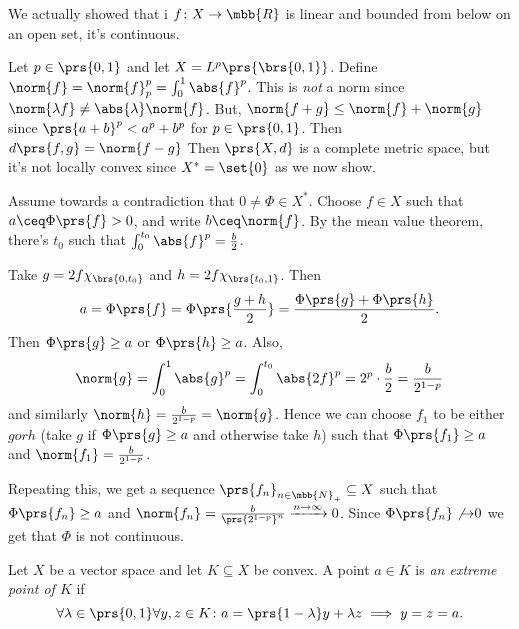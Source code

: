 \documentclass[10pt, twoside]{book}
\begin{document}
\begin{remark}
We actually showed that i $f \colon X \to \mbb{R}$ is linear and bounded from below on an open set, it's continuous.
\end{remark}

\begin{example}
Let $p \in \prs{0,1}$ and let $X = L^p\prs{\brs{0,1}}$.
Define
$\norm{f} = \norm{f}_p^p = \int_0^1 \abs{f}^p$.
This is \emph{not} a norm since $\norm{\lambda f} \neq \abs{\lambda} \norm{f}$. But, $\norm{f+g} \leq \norm{f} + \norm{g}$ since $\prs{a+b}^p < a^p + b^p$ for $p \in \prs{0,1}$.
Then $d\prs{f,g} = \norm{f-g}$ Then $\prs{X,d}$ is a complete metric space, but it's not locally convex since $X^* = \set{0}$ as we now show.

Assume towards a contradiction that $0 \neq \Phi \in X^*$. Choose $f \in X$ such that $a \ceq \Phi\prs{f} > 0$, and write $b \ceq \norm{f}$. By the mean value theorem, there's $t_0$ such that $\int_0^{t_0} \abs{f}^p = \frac{b}{2}$.

Take $g = 2 f \chi_{\brs{0,t_0}}$ and $h = 2 f\chi_{\brs{t_0, 1}}$. Then
\[a = \Phi\prs{f} = \Phi\prs{\frac{g+h}{2}} = \frac{\Phi\prs{g} + \Phi\prs{h}}{2} \text{.}\]
Then $\Phi\prs{g} \geq a$ or $\Phi\prs{h} \geq a$.
Also,
\[\norm{g} = \int_0^1 \abs{g}^p = \int_0^{t_0} \abs{2f}^p = 2^p \cdot \frac{b}{2} = \frac{b}{2^{1-p}}\]
and similarly $\norm{h} = \frac{b}{2^{1-p}} = \norm{g}$.
Hence we can choose $f_1$ to be either $g or h$ (take $g$ if $\Phi\prs{g} \geq a$ and otherwise take $h$) such that $\Phi\prs{f_1} \geq a$ and $\norm{f_1} = \frac{b}{2^{1-p}}$.

Repeating this, we get a sequence $\prs{f_n}_{n \in \mbb{N}_+} \subseteq X$ such that $\Phi\prs{f_n} \geq a$ and $\norm{f_n} = \frac{b}{\prs{2^{1-p}}^n} \xrightarrow{n\to\infty} 0$.
Since $\Phi\prs{f_n} \not{\to} 0$ we get that $\Phi$ is not continuous.
\end{example}

\begin{definition}
Let $X$ be a vector space and let $K \subseteq X$ be convex. A point $a \in K$ is \emph{an extreme point of $K$} if
\[\forall \lambda \in \prs{0,1} \forall y,z \in K \colon a = \prs{1-\lambda} y + \lambda z \implies y = z = a \text{.}\]
\end{definition}
\end{document}
